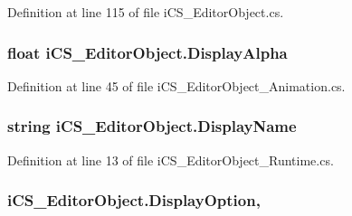 Definition at line 115 of file i\+C\+S\+\_\+\+Editor\+Object.\+cs.

\hypertarget{classi_c_s___editor_object_ac398fc9910f75bf10205f33a7ff1bc59}{
\subsubsection[{Display\+Alpha}]{\setlength{\rightskip}{0pt plus 5cm}float i\+C\+S\+\_\+\+Editor\+Object.\+Display\+Alpha\hspace{0.3cm}{\ttfamily [get]}}}\label{classi_c_s___editor_object_ac398fc9910f75bf10205f33a7ff1bc59}


Definition at line 45 of file i\+C\+S\+\_\+\+Editor\+Object\+\_\+\+Animation.\+cs.

\hypertarget{classi_c_s___editor_object_a63c0686c5b01c08e6ff35441580b00f4}{
\subsubsection[{Display\+Name}]{\setlength{\rightskip}{0pt plus 5cm}string i\+C\+S\+\_\+\+Editor\+Object.\+Display\+Name\hspace{0.3cm}{\ttfamily [get]}}}\label{classi_c_s___editor_object_a63c0686c5b01c08e6ff35441580b00f4}


Definition at line 13 of file i\+C\+S\+\_\+\+Editor\+Object\+\_\+\+Runtime.\+cs.

\hypertarget{classi_c_s___editor_object_aaf44013e386bde8f1827c93f38967169}{
\subsubsection[{Display\+Option}]{ i\+C\+S\+\_\+\+Editor\+Object.\+Display\+Option\hspace{0.3cm}{\ttfamily [get]}, {\ttfamily [set]}}}\label{classi_c_s___editor_object_aaf44013e386bde8f1827c93f38967169}


